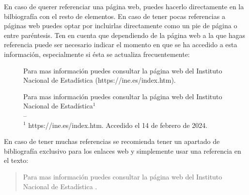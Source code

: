 En caso de querer referenciar una página web, puedes hacerlo directamente en la bilbiografía con el resto de elementos. En caso de tener pocas referencias a páginas web puedes optar por incluirlas directamente como un pie de página o entre paréntesis. Ten en cuenta que dependiendo de la página web a la que hagas referencia puede ser necesario indicar el momento en que se ha accedido a esta información, especialmente si ésta se actualiza frecuentemente:

\begin{figure}[!ht]
    \begin{minipage}{.45\textwidth}
        \begin{it}
        Para mas información puedes consultar la página web del Instituto Nacional de Estadística (https://ine.es/index.htm).
        \end{it}
    \end{minipage}
    \hfill
    \begin{minipage}{.45\textwidth}
        \begin{it}
        Para mas información puedes consultar la página web del Instituto Nacional de Estadística$^1$\\
        --\\
        $^1$ https://ine.es/index.htm. Accedido el 14 de febrero de 2024.
        \end{it}
    \end{minipage}
\end{figure}

En caso de tener muchas referencias se recomienda tener un apartado de bibliografía exclusivo para los enlaces web y simplemente usar una referencia en el texto:

\begin{quote}
\begin{it}
    Para mas información puedes consultar la página web del Instituto Nacional de Estadística \cite{INE}.
\end{it}
\end{quote}

